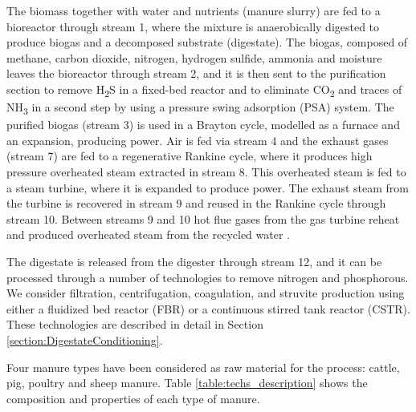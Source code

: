 \begin{refsection}[referencesCh2]
The biomass together with water and nutrients (manure slurry) are fed to a bioreactor through stream 1, where the mixture is anaerobically digested to produce biogas and a decomposed substrate (digestate). The biogas, composed of methane, carbon dioxide, nitrogen, hydrogen sulfide, ammonia and moisture leaves the bioreactor through stream 2, and it is then sent to the purification section to remove H\textsubscript{2}S in a fixed-bed reactor and to eliminate CO\textsubscript{2} and traces of NH\textsubscript{3} in a second step by using a pressure swing adsorption (PSA) system. The purified biogas (stream 3) is used in a Brayton cycle, modelled as a furnace and an expansion, producing power. Air is fed via stream 4 and the exhaust gases (stream 7) are fed to a regenerative Rankine cycle, where it produces high pressure overheated steam extracted in stream 8. This overheated steam is fed to a steam turbine, where it is expanded to produce power. The exhaust steam from the turbine is recovered in stream 9 and reused in the Rankine cycle through stream 10. Between streams 9 and 10 hot flue gases from the gas turbine reheat and produced overheated steam from the recycled water \citep{Leon}.

The digestate is released from the digester through stream 12, and it can be processed through a number of technologies to remove nitrogen and phosphorous. We consider filtration, centrifugation, coagulation, and struvite production using either a fluidized bed reactor (FBR) or a continuous stirred tank reactor (CSTR). These technologies are described in detail in Section \ref{section:DigestateConditioning}.

Four manure types have been considered as raw material for the process: cattle, pig, poultry and sheep manure. Table \ref{table:techs_description} shows the composition and properties of each type of manure.


\end{refsection}
